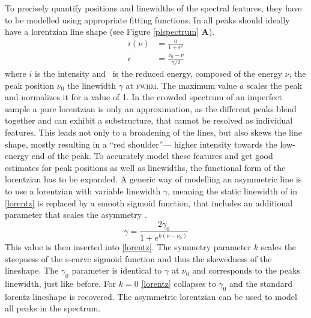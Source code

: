 To precisely quantify positions and linewidths of the spectral features, they have to be modelled using appropriate fitting functions. In \pl all peaks should ideally have a lorentzian line shape (see Figure \ref{plspectrum} \textbf{A}). 
\begin{align}
i(\nu)&= \frac{a}{1+\epsilon^2} \\
\epsilon &= \frac{\nu_0 - \nu}{\gamma /2}\label{lorentz}
\end{align}
where $i$ is the intensity and \epsilon\ is the reduced energy, composed of the energy $\nu$, the peak position $\nu_0$ the linewidth $\gamma$ at \textsc{fwhm}. The maximum value $a$ scales the peak and normalizes it for a value of 1. In the crowded spectrum of an imperfect sample a pure lorentzian is only an approximation, as the different peaks blend together and can exhibit a substructure, that cannot be resolved as individual features. This leads not only to a broadening of the lines, but also skews the line shape, mostly resulting in a ``red shoulder''--- higher intensity towards the low-energy end of the peak. To accurately model these features and get good estimates for peak positions as well as linewidths, the functional form of the lorentzian has to be expanded. A generic way of modelling an asymmetric line is to use a lorentzian with variable linewidth $\gamma$, meaning the static linewidth of in \ref{lorentz} is replaced by a smooth sigmoid function, that includes an additional parameter that scales the asymmetry \cite{stancik_simple_2008}.
\begin{equation} \gamma = \frac{2\gamma_0}{1+e^{k(\nu-\nu_0)}}\label{asymlorentz} \end{equation}
This value is then inserted into \eqref{lorentz}. The symmetry parameter $k$ scales the steepness of the s-curve sigmoid function and thus the skewedness of the lineshape. The $\gamma_0$ parameter is identical to $\gamma$ at $\nu_0$ and corresponds to the peaks linewidth, just like before. For $k=0$ \eqref{lorentz} collapses to $\gamma_0$ and the standard lorentz lineshape is recovered. The asymmetric lorentzian can be used to model all peaks in the \pl spectrum.

